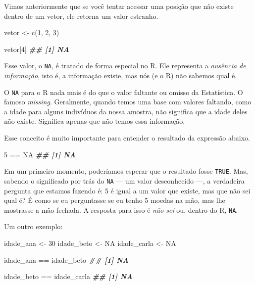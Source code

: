 \documentclass[
]{book}
\newenvironment{Shaded}{\begin{snugshade}}{\end{snugshade}}
\newcommand{\ConstantTok}[1]{\textcolor[rgb]{0.00,0.00,0.00}{#1}}
\newcommand{\DecValTok}[1]{\textcolor[rgb]{0.00,0.00,0.81}{#1}}
\newcommand{\DocumentationTok}[1]{\textcolor[rgb]{0.56,0.35,0.01}{\textbf{\textit{#1}}}}
\newcommand{\FunctionTok}[1]{\textcolor[rgb]{0.00,0.00,0.00}{#1}}
\newcommand{\NormalTok}[1]{#1}
\newcommand{\OtherTok}[1]{\textcolor[rgb]{0.56,0.35,0.01}{#1}}
\newcommand{\SpecialCharTok}[1]{\textcolor[rgb]{0.00,0.00,0.00}{#1}}
\begin{document}
Vimos anteriormente que se você tentar acessar uma posição que não existe dentro de um vetor, ele retorna um valor estranho.

\begin{Shaded}
\begin{Highlighting}[]
\NormalTok{vetor }\OtherTok{\textless{}{-}} \FunctionTok{c}\NormalTok{(}\DecValTok{1}\NormalTok{, }\DecValTok{2}\NormalTok{, }\DecValTok{3}\NormalTok{)}

\NormalTok{vetor[}\DecValTok{4}\NormalTok{]}
\DocumentationTok{\#\# [1] NA}
\end{Highlighting}
\end{Shaded}

Esse valor, o \texttt{NA}, é tratado de forma especial no R. Ele representa a \emph{ausência de informação}, isto é, a informação existe, mas nós (e o R) não sabemos qual é.

O \texttt{NA} para o R nada mais é do que o valor faltante ou omisso da Estatística. O famoso \emph{missing}. Geralmente, quando temos uma base com valores faltando, como a idade para alguns indivíduos da nossa amostra, não significa que a idade deles não existe. Significa apenas que não temos essa informação.

Esse conceito é muito importante para entender o resultado da expressão abaixo.

\begin{Shaded}
\begin{Highlighting}[]
\DecValTok{5} \SpecialCharTok{==} \ConstantTok{NA}
\DocumentationTok{\#\# [1] NA}
\end{Highlighting}
\end{Shaded}

Em um primeiro momento, poderíamos esperar que o resultado fosse \texttt{TRUE}. Mas, sabendo o significado por trás do \texttt{NA} --- um valor desconhecido ---, a verdadeira pergunta que estamos fazendo é: 5 é igual a um valor que existe, mas que não sei qual é? É como se eu perguntasse se eu tenho 5 moedas na mão, mas lhe mostrasse a mão fechada. A resposta para isso é \emph{não sei} ou, dentro do R, \texttt{NA}.

Um outro exemplo:

\begin{Shaded}
\begin{Highlighting}[]
\NormalTok{idade\_ana }\OtherTok{\textless{}{-}} \DecValTok{30}
\NormalTok{idade\_beto }\OtherTok{\textless{}{-}} \ConstantTok{NA}
\NormalTok{idade\_carla }\OtherTok{\textless{}{-}} \ConstantTok{NA}

\NormalTok{idade\_ana }\SpecialCharTok{==}\NormalTok{ idade\_beto}
\DocumentationTok{\#\# [1] NA}

\NormalTok{idade\_beto }\SpecialCharTok{==}\NormalTok{ idade\_carla}
\DocumentationTok{\#\# [1] NA}
\end{Highlighting}
\end{Shaded}
\end{document}
